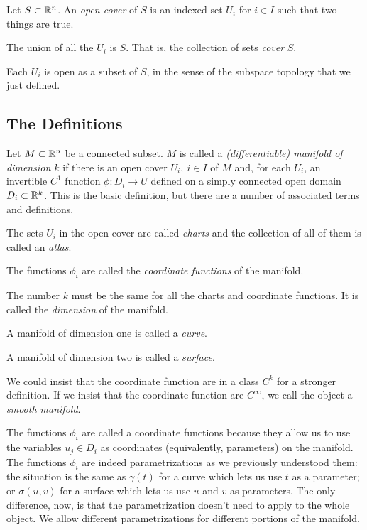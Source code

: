 \documentclass[fleqn,letterpaper]{report}
\begin{document}
\begin{defn}
Let $S \subset \mathbb{R}^n$. An \emph{open cover} of $S$ is an
indexed set $U_i$ for $i \in I$ such that two things are true.
\begin{smallitemize}
\item The union of all the $U_i$ is $S$. That is, the
collection of sets \emph{cover} $S$. 
\item Each $U_i$ is open as a subset of $S$, in the
sense of the subspace topology that we just defined. 
\end{smallitemize}
\end{defn}

\subsection{The Definitions}
\label{manifold-definition}

\begin{defn}
Let $M \subset \mathbb{R}^n$ be a connected subset. $M$ is called a
\emph{(differentiable) manifold of dimension $k$} if there is
an open cover $U_i, \ i \in I$ of $M$ and, for each $U_i$, an
invertible $C^1$ function $\phi: D_i \rightarrow U$ defined on
a simply connected open domain $D_i \subset \mathbb{R}^k$.  This is
the basic definition, but there are a number of associated
terms and definitions.
\begin{smallitemize}
\item The sets $U_i$ in the open cover are called
\emph{charts} and the collection of all of them is called an
\emph{atlas}. 
\item The functions $\phi_i$ are called the \emph{coordinate
functions} of the manifold. 
\item The number $k$ must be the same for all the charts and
coordinate functions. It is called the \emph{dimension} of the
manifold. 
\item A manifold of dimension one is called a \emph{curve}. 
\item A manifold of dimension two is called a \emph{surface}. 
\item We could insist that the coordinate function are in a
class $C^k$ for a stronger definition. If we insist that the
coordinate function are $C^{\infty}$, we call the object a
\emph{smooth manifold}. 
\end{smallitemize}
\end{defn}

The functions $\phi_i$ are called a coordinate functions
because they allow us to use the variables $u_j \in D_i$ as
coordinates (equivalently, parameters) on the manifold. The
functions $\phi_i$ are indeed parametrizations as we
previously understood them: the situation is the same as
$\gamma(t)$ for a curve which lets us use $t$ as a parameter;
or $\sigma(u,v)$ for a surface which lets us use $u$ and $v$
as parameters. The only difference, now, is that the
parametrization doesn't need to apply to the whole object. We
allow different parametrizations for different portions of the
manifold.
\end{document}
